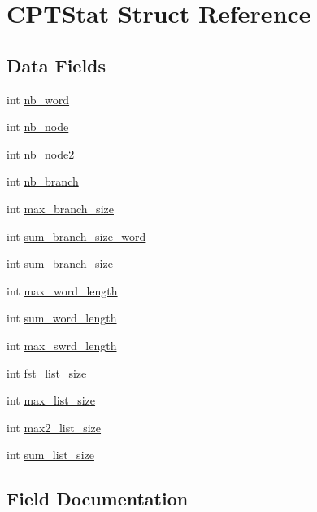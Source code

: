 \hypertarget{structCPTStat}{}\section{C\+P\+T\+Stat Struct Reference}
\label{structCPTStat}
\subsection*{Data Fields}
\begin{DoxyCompactItemize}
\item 
int \hyperlink{structCPTStat_a58ac2be00efae25c2327d9633b0012d4}{nb\+\_\+word}
\item 
int \hyperlink{structCPTStat_a2fe3f9ca6e2298de8fe583d1998cfa8b}{nb\+\_\+node}
\item 
int \hyperlink{structCPTStat_a1f2b46fe4d9376cb139ac2828467bfce}{nb\+\_\+node2}
\item 
int \hyperlink{structCPTStat_af76928968bae2b707f069814504b5045}{nb\+\_\+branch}
\item 
int \hyperlink{structCPTStat_ae20f9509f4998f41157167b0eb7065b4}{max\+\_\+branch\+\_\+size}
\item 
int \hyperlink{structCPTStat_adaea66ddd9de22bf900d0eeeb5486eac}{sum\+\_\+branch\+\_\+size\+\_\+word}
\item 
int \hyperlink{structCPTStat_a3b3e8fa6689f9725a871430adddf0f30}{sum\+\_\+branch\+\_\+size}
\item 
int \hyperlink{structCPTStat_ab03796b9949b9a21fa98a901390ca619}{max\+\_\+word\+\_\+length}
\item 
int \hyperlink{structCPTStat_a8db546c8f4954a69815d75a4ab62a884}{sum\+\_\+word\+\_\+length}
\item 
int \hyperlink{structCPTStat_a05b16154f6a16eb86044c904c7db9de5}{max\+\_\+swrd\+\_\+length}
\item 
int \hyperlink{structCPTStat_aaec7403d2c937e97e1f323b4603d7a17}{fst\+\_\+list\+\_\+size}
\item 
int \hyperlink{structCPTStat_a80e4787886e45e62cff7232be9f4cd7c}{max\+\_\+list\+\_\+size}
\item 
int \hyperlink{structCPTStat_acac2689f27927c81da60a96191c99b30}{max2\+\_\+list\+\_\+size}
\item 
int \hyperlink{structCPTStat_ad99f1b443d4a863deb09e79760adf33f}{sum\+\_\+list\+\_\+size}
\end{DoxyCompactItemize}


\subsection{Field Documentation}
